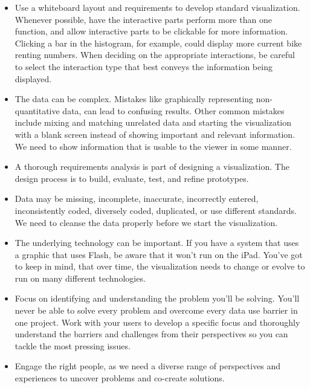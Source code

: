 \begin{itemize}
\item Use a whiteboard layout and requirements to develop standard visualization. Whenever possible, have the interactive parts perform more than one function, and allow interactive parts to be clickable for more information. Clicking a bar in the histogram, for example, could display more current bike renting numbers. When deciding on the appropriate interactions, be careful to select the interaction type that best conveys the information being displayed. 
\item The data can be complex. Mistakes like graphically representing non-quantitative data, can lead to confusing results. Other common mistakes include mixing and matching unrelated data and starting the visualization with a blank screen instead of showing important and relevant information. We need to show information that is usable to the viewer in some manner.
\item A thorough requirements analysis is part of designing a visualization. The design process is to build, evaluate, test, and refine prototypes.
\item Data may be missing, incomplete, inaccurate, incorrectly entered, inconsistently coded, diversely coded, duplicated, or use different standards. We need to cleanse the data properly before we start the visualization.
\item  The underlying technology can be important. If you have a system that uses a graphic that uses Flash, be aware that it won’t run on the iPad. You’ve got to keep in mind, that over time, the visualization needs to change or evolve to run on many different technologies.
\item Focus on identifying and understanding the problem you’ll be solving. You’ll never be able to solve every problem and overcome every data use barrier in one project. Work with your users to develop a specific focus and thoroughly understand the barriers and challenges from their perspectives so you can tackle the most pressing issues.
\item Engage the right people, as we need a diverse range of perspectives and experiences to uncover problems and co-create solutions. 

\end{itemize}

